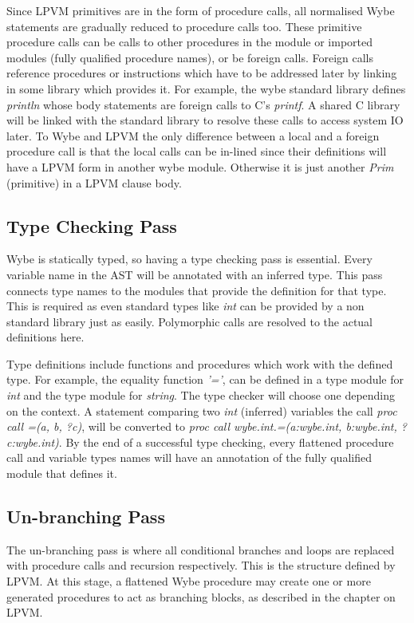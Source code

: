 Since LPVM primitives are in the form of procedure calls, all normalised Wybe
statements are gradually reduced to procedure calls too. These primitive
procedure calls can be calls to other procedures in the module or imported
modules (fully qualified procedure names), or be foreign calls. Foreign calls
reference procedures or instructions which have to be addressed later by
linking in some library which provides it. For example, the wybe standard
library defines \textit{println} whose body statements are foreign calls to C's
\textit{printf}. A shared C library will be linked with the standard library to
resolve these calls to access system IO later. To Wybe and LPVM the only
difference between a local and a foreign procedure call is that the local calls
can be in-lined since their definitions will have a LPVM form in another wybe
module. Otherwise it is just another \textit{Prim} (primitive) in a LPVM clause
body.

\subsection{Type Checking Pass}

Wybe is statically typed, so having a type checking pass is essential. Every
variable name in the AST will be annotated with an inferred type. This pass
connects type names to the modules that provide the definition for that
type. This is required as even standard types like \textit{int} can be provided
by a non standard library just as easily. Polymorphic calls are resolved to the
actual definitions here.

Type definitions include functions and procedures which work with the defined
type. For example, the equality function \textit{'='}, can be defined in a type
module for \textit{int} and the type module for \textit{string}. The type
checker will choose one depending on the context. A statement comparing two
\textit{int} (inferred) variables the call \textit{proc call =(a, b, ?c)}, will
be converted to \textit{proc call wybe.int.=(a:wybe.int, b:wybe.int,
  ?c:wybe.int)}. By the end of a successful type checking, every flattened
procedure call and variable types names will have an annotation of the fully
qualified module that defines it.


\subsection{Un-branching Pass}

The un-branching pass is where all conditional branches and loops are replaced
with procedure calls and recursion respectively. This is the structure defined
by LPVM. At this stage, a flattened Wybe procedure may create one or more
generated procedures to act as branching blocks, as described in the chapter on
LPVM.


